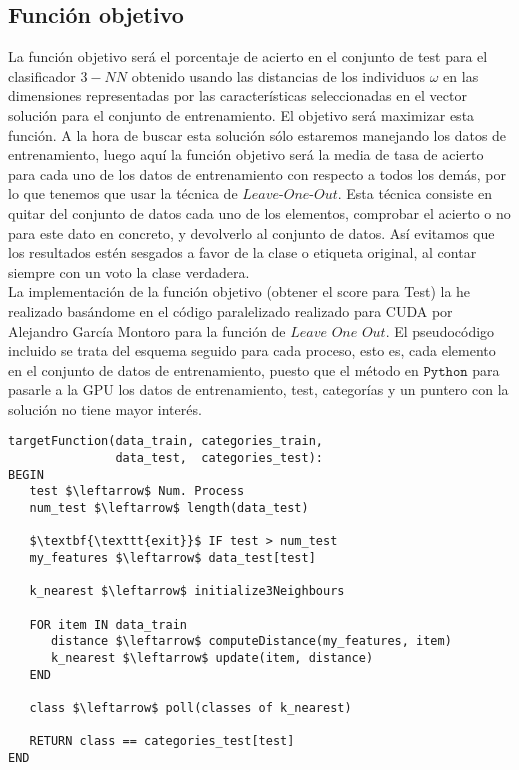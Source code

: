 \documentclass[11pt,leqno]{article}
\begin{document}
\subsection{Función objetivo}
	La función objetivo será el porcentaje de acierto en el conjunto de test para el clasificador $3-NN$ obtenido usando las distancias de los individuos $\omega$ en las dimensiones representadas por las características seleccionadas en el vector solución para el conjunto de entrenamiento. El objetivo será maximizar esta función. A la hora de buscar esta solución sólo estaremos manejando los datos de entrenamiento, luego aquí la función objetivo será la media de tasa de acierto para cada uno de los datos de entrenamiento con respecto a todos los demás, por lo que tenemos que usar la técnica de $\textit{Leave-One-Out}$. Esta técnica consiste en quitar del conjunto de datos cada uno de los elementos, comprobar el acierto o no para este dato en concreto, y devolverlo al conjunto de datos. Así evitamos que los resultados estén sesgados a favor de la clase o etiqueta original, al contar siempre con un voto la clase verdadera.\\
	La implementación de la función objetivo (obtener el score para Test) la he realizado basándome en el código paralelizado realizado para CUDA por Alejandro García Montoro para la función de $\textit{Leave One Out}$. El pseudocódigo incluido se trata del esquema seguido para cada proceso, esto es, cada elemento en el conjunto de datos de entrenamiento, puesto que el método en $\texttt{Python}$ para pasarle a la GPU los datos de entrenamiento, test, categorías y un puntero con la solución no tiene mayor interés.
	
\begin{lstlisting}[mathescape=true]
targetFunction(data_train, categories_train, 
               data_test,  categories_test):
BEGIN
   test $\leftarrow$ Num. Process
   num_test $\leftarrow$ length(data_test)
   
   $\textbf{\texttt{exit}}$ IF test > num_test
   my_features $\leftarrow$ data_test[test]
   
   k_nearest $\leftarrow$ initialize3Neighbours
	
   FOR item IN data_train
      distance $\leftarrow$ computeDistance(my_features, item)
      k_nearest $\leftarrow$ update(item, distance)
   END
	
   class $\leftarrow$ poll(classes of k_nearest)
      
   RETURN class == categories_test[test]
END
\end{lstlisting}
\end{document}
